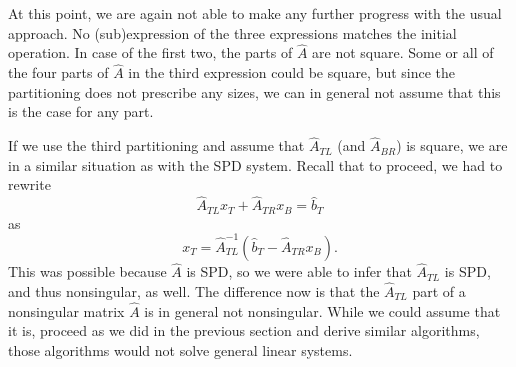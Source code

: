 At this point, we are again not able to make any further progress with the usual approach. No (sub)expression of the three expressions matches the initial operation. In case of the first two, the parts of $\hat{A}$ are not square. Some or all of the four parts of $\hat{A}$ in the third expression could be square, but since the partitioning does not prescribe any sizes, we can in general not assume that this is the case for any part.

If we use the third partitioning and assume that $\hat{A}_{TL}$ (and $\hat{A}_{BR}$) is square, we are in a similar situation as with the SPD system. Recall that to proceed, we had to rewrite
%
$$\hat{A}_{TL} x_T + \hat{A}_{TR} x_B  = \hat{b}_T$$
%
as 
%
$$x_T = \hat{A}_{TL}^{-1} \left( \hat{b}_T - \hat{A}_{TR} x_B \right) \text{.}$$
%
This was possible because $\hat{A}$ is SPD, so we were able to infer that $\hat{A}_{TL}$ is SPD, and thus nonsingular, as well. The difference now is that the $\hat{A}_{TL}$ part of a nonsingular matrix $\hat{A}$ is in general not nonsingular. While we could assume that it is, proceed as we did in the previous section and derive similar algorithms, those algorithms would not solve general linear systems. 

%
%



